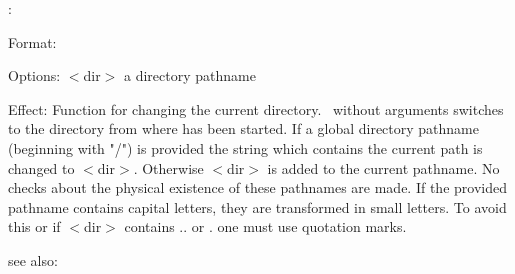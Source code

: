 \colab{} \cd:

Format: \\

Options: $<$dir$>$ a directory pathname

Effect: Function for changing the current directory.
	\cd \ without arguments switches to the directory from where 
	\COLAB{} has been started. 
	If a global directory pathname (beginning with "/") is provided
	the string which contains the current path is changed to $<$dir$>$.
	Otherwise $<$dir$>$ is added to the current pathname. No checks 
	about the physical existence of these pathnames are made.
	If the provided pathname contains capital letters, they are
	transformed in small letters. To avoid this or if $<$dir$>$
        contains .. or . one must use quotation marks.
        
see also: \pwd
